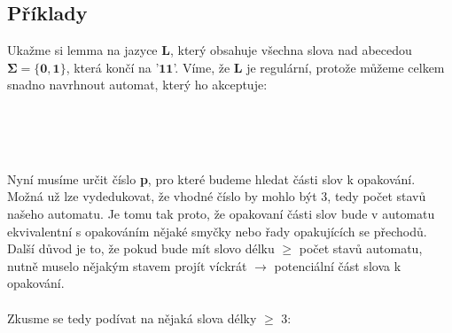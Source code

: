 \documentclass{report}
\begin{document}
    \subsection*{Příklady}
    Ukažme si lemma na jazyce \textbf{L}, který obsahuje všechna slova nad abecedou $\mathbf{\Sigma=\{0,1\}}$, která končí na '$\mathbf{11}$'. Víme, že \textbf{L} je regulární, protože můžeme celkem snadno navrhnout automat, který ho akceptuje:\\ \\
    \begin{center}
    \\ \\
    \end{center}
    Nyní musíme určit číslo \textbf{p}, pro které budeme hledat části slov k opakování. Možná už lze vydedukovat, že vhodné číslo by mohlo být 3, tedy počet stavů našeho automatu. Je tomu tak proto, že opakovaní části slov bude v automatu ekvivalentní s opakováním nějaké smyčky nebo řady opakujících se přechodů. Další důvod je to, že pokud bude mít slovo délku $\ge$ počet stavů automatu, nutně muselo nějakým stavem projít víckrát $\rightarrow$ potenciální část slova k opakování.\\ \\
    Zkusme se tedy podívat na nějaká slova délky $\ge$ 3:
\end{document}
